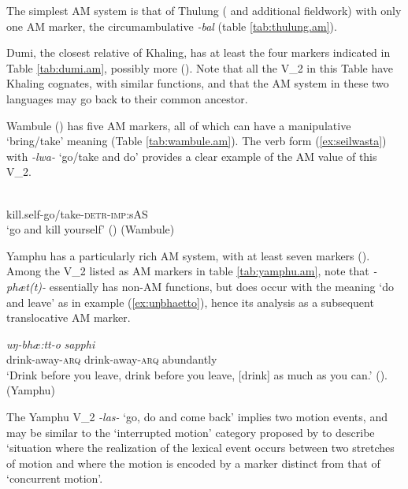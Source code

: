 \documentclass[oneside,a4paper,11pt]{article}
\newcommand{\ipa}[1]{{\phon\textit{#1}}}
\newcommand{\sens}[1]{‘#1’}
\newcommand{\rouge}[1]{{\color{red}#1}}
\begin{document}
The simplest AM system is that of Thulung (\citealt{lahaussois02thulung} and additional fieldwork) with only one AM marker, the circumambulative \ipa{-bal} (table \ref{tab:thulung.am}).

Dumi, the closest relative of Khaling, has at least the four markers indicated in Table \ref{tab:dumi.am}, possibly more (\citealt[199-214]{driem93dumi}). Note that all the V_2 in this Table have Khaling cognates, with similar functions, and that the AM system in these two languages may go back to their common ancestor.

Wambule (\citealt{opgenort04wambule}) has five AM markers, all of which can have a manipulative `bring/take' meaning (Table   \ref{tab:wambule.am}). The verb form (\ref{ex:seilwasta}) with  \ipa{-lwa-} `go/take and do' provides a clear example of the AM value of this V_2.
 
\begin{exe}
\ex \label{ex:seilwasta}
\gll \ipa{sei-\rouge{lwa}-s-ta} \\
kill.self-\rouge{go/take}-\textsc{detr}-\textsc{imp}:sAS   \\
\glt \sens{go and kill yourself} (\citealt[439]{opgenort04wambule})  (Wambule)
\end{exe}

Yamphu has a particularly rich AM system, with at least seven markers (\citealt[137-194]{rutgers98yamphu}). Among the V_2 listed as AM markers in table \ref{tab:yamphu.am}, note that \ipa{-phæt(t)-} essentially has non-AM functions, but does occur with the meaning `do and leave' as in example (\ref{ex:uŋbhaetto}), hence its analysis as a subsequent translocative AM marker.  
 
 \begin{exe}
\ex \label{ex:uŋbhaetto}
\gll \ipa{uŋ-\rouge{bhæ:tt}-o}	\ipa{uŋ-\rouge{bhæ:tt}-o}	\ipa{sapphi} \\
drink-\rouge{away}-\textsc{arq} drink-\rouge{away}-\textsc{arq}  abundantly\\
\glt \sens{Drink before you leave, drink before you leave, [drink] as much as you can.} (\citealt[150]{rutgers98yamphu}). (Yamphu)
\end{exe}

The Yamphu V_2 \ipa{-las-} `go, do and come back' implies two motion events, and may be similar to the `interrupted motion' category proposed by \citet[123]{rose15am} to describe `situation where the realization of the lexical event occurs between two stretches of motion and where the motion is encoded by a marker distinct from that of `concurrent motion'.
\end{document}
